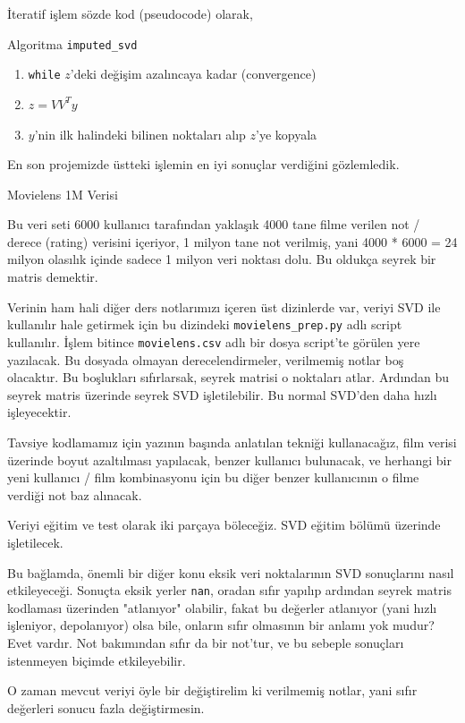 \documentclass[12pt,fleqn]{article}\usepackage{../../common}
\begin{document}
İteratif işlem sözde kod (pseudocode) olarak,

Algoritma \verb!imputed_svd!
\begin{enumerate}
  \item \verb!while! $z$'deki değişim azalıncaya kadar (convergence)
  \item $z = VV^Ty$ 
  \item  $y$'nin ilk halindeki bilinen noktaları alıp $z$'ye kopyala
\end{enumerate}

En son projemizde üstteki işlemin en iyi sonuçlar verdiğini gözlemledik. 

Movielens 1M Verisi

Bu veri seti 6000 kullanıcı tarafından yaklaşık 4000 tane filme
verilen not / derece (rating) verisini içeriyor, 1 milyon tane not
verilmiş, yani 4000 * 6000 = 24 milyon olasılık içinde sadece 1 milyon
veri noktası dolu. Bu oldukça seyrek bir matris demektir.

Verinin ham hali diğer ders notlarımızı içeren üst dizinlerde var, veriyi
SVD ile kullanılır hale getirmek için bu dizindeki \verb!movielens_prep.py!
adlı script kullanılır. İşlem bitince \verb!movielens.csv! adlı bir dosya
script'te görülen yere yazılacak. Bu dosyada olmayan derecelendirmeler,
verilmemiş notlar boş olacaktır. Bu boşlukları sıfırlarsak, seyrek matrisi
o noktaları atlar. Ardından bu seyrek matris üzerinde seyrek SVD
işletilebilir. Bu normal SVD'den daha hızlı işleyecektir.

Tavsiye kodlamamız için yazının başında anlatılan tekniği kullanacağız, film
verisi üzerinde boyut azaltılması yapılacak, benzer kullanıcı bulunacak, ve
herhangi bir yeni kullanıcı / film kombinasyonu için bu diğer benzer
kullanıcının o filme verdiği not baz alınacak.

Veriyi eğitim ve test olarak iki parçaya böleceğiz. SVD eğitim bölümü
üzerinde işletilecek.

Bu bağlamda, önemli bir diğer konu eksik veri noktalarının SVD
sonuçlarını nasıl etkileyeceği. Sonuçta eksik yerler \verb!nan!,
oradan sıfır yapılıp ardından seyrek matris kodlaması üzerinden
"atlanıyor" olabilir, fakat bu değerler atlanıyor (yani hızlı
işleniyor, depolanıyor) olsa bile, onların sıfır olmasının bir anlamı
yok mudur? Evet vardır. Not bakımından sıfır da bir not'tur, ve bu
sebeple sonuçları istenmeyen biçimde etkileyebilir.

O zaman mevcut veriyi öyle bir değiştirelim ki verilmemiş notlar, yani
sıfır değerleri sonucu fazla değiştirmesin.
\end{document}

